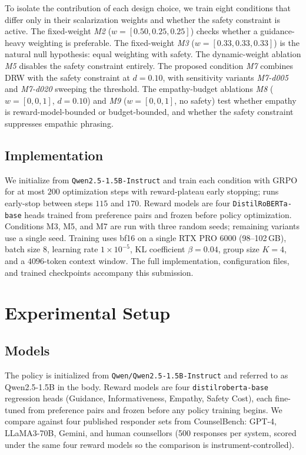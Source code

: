 \documentclass[10pt,twocolumn]{article}
\begin{document}
To isolate the contribution of each design choice, we train eight conditions that differ only in their scalarization weights and whether the safety constraint is active. The fixed-weight \emph{M2} ($w = [0.50, 0.25, 0.25]$) checks whether a guidance-heavy weighting is preferable. The fixed-weight \emph{M3} ($w = [0.33, 0.33, 0.33]$) is the natural null hypothesis: equal weighting with safety. The dynamic-weight ablation \emph{M5} disables the safety constraint entirely. The proposed condition \emph{M7} combines DRW with the safety constraint at $d = 0.10$, with sensitivity variants \emph{M7-d005} and \emph{M7-d020} sweeping the threshold. The empathy-budget ablations \emph{M8} ($w = [0, 0, 1]$, $d = 0.10$) and \emph{M9} ($w = [0, 0, 1]$, no safety) test whether empathy is reward-model-bounded or budget-bounded, and whether the safety constraint suppresses empathic phrasing.

\subsection{Implementation}

We initialize from \texttt{Qwen2.5-1.5B-Instruct} and train each condition with GRPO for at most $200$ optimization steps with reward-plateau early stopping; runs early-stop between steps $115$ and $170$. Reward models are four \texttt{DistilRoBERTa-base} heads trained from preference pairs and frozen before policy optimization. Conditions M3, M5, and M7 are run with three random seeds; remaining variants use a single seed. Training uses bf16 on a single RTX PRO 6000 (98--102\,GB), batch size $8$, learning rate $1\!\times\!10^{-5}$, KL coefficient $\beta = 0.04$, group size $K = 4$, and a $4096$-token context window. The full implementation, configuration files, and trained checkpoints accompany this submission.

\section{Experimental Setup}
\label{sec:experiments}

\subsection{Models}

The policy is initialized from \texttt{Qwen/Qwen2.5-1.5B-Instruct} and referred to as Qwen2.5-1.5B in the body. Reward models are four \texttt{distilroberta-base} regression heads (Guidance, Informativeness, Empathy, Safety Cost), each fine-tuned from preference pairs and frozen before any policy training begins. We compare against four published responder sets from CounselBench: GPT-4, LLaMA3-70B, Gemini, and human counsellors (500 responses per system, scored under the same four reward models so the comparison is instrument-controlled).
\end{document}
